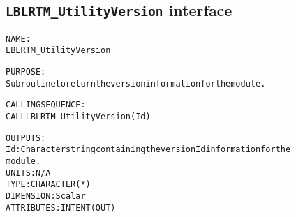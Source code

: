 \subsection{\texttt{LBLRTM\_UtilityVersion} interface}
  \label{sec:LBLRTM_UtilityVersion_interface}
  \begin{alltt}
 
  NAME:
        LBLRTM_UtilityVersion
 
  PURPOSE:
        Subroutine to return the version information for the module.
 
  CALLING SEQUENCE:
        CALL LBLRTM_UtilityVersion( Id )
 
  OUTPUTS:
        Id:     Character string containing the version Id information for the
                module.
                UNITS:      N/A
                TYPE:       CHARACTER(*)
                DIMENSION:  Scalar
                ATTRIBUTES: INTENT(OUT)
 
  \end{alltt}
